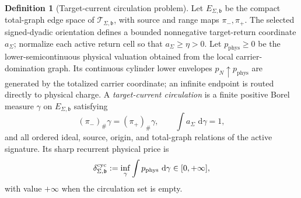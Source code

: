 \documentclass[11pt]{article}
\numberwithin{section}{part}
\theoremstyle{plain}
\theoremstyle{definition}
\newtheorem{definition}[definition]{Definition}
\theoremstyle{remark}
\newcommand{\dd}{\,\mathrm d}
\newcommand{\Spine}{\mathscr T}
\newcommand{\Phys}{\mathrm{phys}}
\begin{document}
\begin{definition}[Target-current circulation problem]
\label{def:target-current-circulation-problem}
Let \(E_{\Sigma,\mathfrak b}\) be the compact total-graph edge space of
\(\Spine_{\Sigma,\mathfrak b}\), with source and range maps
\(\pi_-,\pi_+\).  The selected signed-dyadic orientation defines a bounded
nonnegative target-return coordinate \(a_\Sigma\); normalize each active
return cell so that \(a_\Sigma\ge\eta>0\).  Let \(p_{\Phys}\ge0\) be the
lower-semicontinuous physical valuation obtained from the local
carrier-domination graph.  Its continuous cylinder lower envelopes
\(p_N\uparrow p_{\Phys}\) are generated by the totalized carrier coordinate;
an infinite endpoint is routed directly to physical charge.  A
\emph{target-current circulation} is a finite positive Borel measure
\(\gamma\) on \(E_{\Sigma,\mathfrak b}\) satisfying
\begin{equation}
 \label{eq:target-current-circulation-constraints}
 (\pi_-)_\#\gamma=(\pi_+)_\#\gamma,
 \qquad
 \int a_\Sigma\,\dd\gamma=1,
\end{equation}
and all ordered ideal, source, origin, and total-graph relations of the active
signature.  Its sharp recurrent physical price is
\begin{equation}
 \label{eq:sharp-recurrent-circulation-price}
 \delta^{\rm cyc}_{\Sigma,\mathfrak b}
 :=\inf_{\gamma}
       \int p_{\Phys}\,\dd\gamma
 \in[0,+\infty],
\end{equation}
with value \(+\infty\) when the circulation set is empty.
\end{definition}
\end{document}
